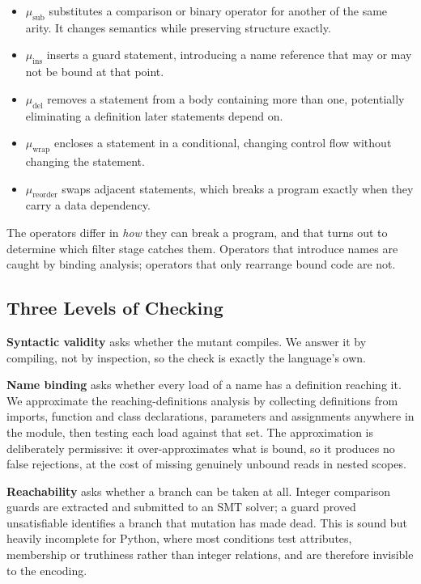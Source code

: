 \documentclass[10pt,twocolumn,letterpaper]{article}
\begin{document}
\begin{itemize}
  \item $\mu_{\text{sub}}$ substitutes a comparison or binary operator for another of the same arity. It changes semantics while preserving structure exactly.
  \item $\mu_{\text{ins}}$ inserts a guard statement, introducing a name reference that may or may not be bound at that point.
  \item $\mu_{\text{del}}$ removes a statement from a body containing more than one, potentially eliminating a definition later statements depend on.
  \item $\mu_{\text{wrap}}$ encloses a statement in a conditional, changing control flow without changing the statement.
  \item $\mu_{\text{reorder}}$ swaps adjacent statements, which breaks a program exactly when they carry a data dependency.
\end{itemize}

The operators differ in \textit{how} they can break a program, and that turns out to determine which filter stage catches them. Operators that introduce names are caught by binding analysis; operators that only rearrange bound code are not.


\subsection{Three Levels of Checking}


\textbf{Syntactic validity} asks whether the mutant compiles. We answer it by compiling, not by inspection, so the check is exactly the language's own.

\textbf{Name binding} asks whether every load of a name has a definition reaching it. We approximate the reaching-definitions analysis by collecting definitions from imports, function and class declarations, parameters and assignments anywhere in the module, then testing each load against that set. The approximation is deliberately permissive: it over-approximates what is bound, so it produces no false rejections, at the cost of missing genuinely unbound reads in nested scopes.

\textbf{Reachability} asks whether a branch can be taken at all. Integer comparison guards are extracted and submitted to an SMT solver; a guard proved unsatisfiable identifies a branch that mutation has made dead. This is sound but heavily incomplete for Python, where most conditions test attributes, membership or truthiness rather than integer relations, and are therefore invisible to the encoding.
\end{document}
